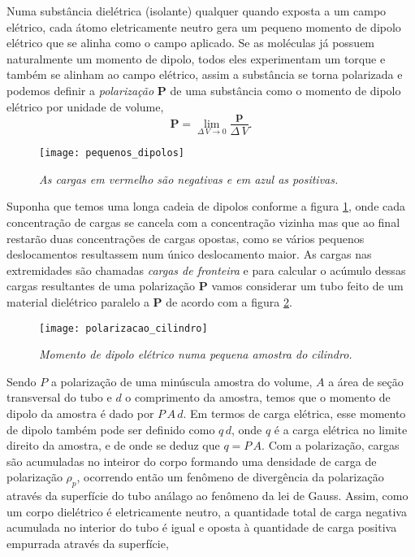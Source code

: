 Numa substância dielétrica (isolante) qualquer quando exposta a um campo elétrico, cada átomo eletricamente neutro gera um pequeno momento de dipolo elétrico que se alinha como o campo aplicado. Se as moléculas já possuem naturalmente um momento de dipolo, todos eles experimentam um torque e também se alinham ao campo elétrico, assim a substância se torna polarizada e podemos definir a \textit{polarização} $\mathbf{P}$ de uma substância como o momento de dipolo elétrico por unidade de volume,
\begin{equation}
\mathbf{P}=\lim_{\Delta\,V\to 0}\frac{\mathbf{p}}{\Delta\,V}.
\end{equation}
\begin{figure}
\centering
\texttt{[image: pequenos\_dipolos]}
\caption{\textit{As cargas em vermelho são negativas e em azul as positivas.}}
\label{fig.penquenos_dipolos}
\end{figure}
Suponha que temos uma longa cadeia de dipolos conforme a figura \ref{fig.penquenos_dipolos}, onde cada concentração de cargas se cancela com a concentração vizinha mas que ao final restarão duas concentrações de cargas opostas, como se vários pequenos deslocamentos resultassem num único deslocamento maior. As cargas nas extremidades são chamadas \textit{cargas de fronteira} e para calcular o acúmulo dessas cargas resultantes de uma polarização $\mathbf{P}$ vamos considerar um tubo feito de um material dielétrico paralelo a $\mathbf{P}$ de acordo com a figura \ref{fig.polari_cilindro}. 
\begin{figure}
\centering
\texttt{[image: polarizacao\_cilindro]}
\caption{\textit{Momento de dipolo elétrico numa pequena amostra do cilindro.}}
\label{fig.polari_cilindro}
\end{figure}
Sendo $P$ a polarização de uma minúscula amostra do volume, $A$ a área de seção transversal do tubo e $d$ o comprimento da amostra, temos que o momento de dipolo da amostra é dado por $P\,A\,d$. Em termos de carga elétrica, esse momento de dipolo também pode ser definido como $q\,d$, onde $q$ é a carga elétrica no limite direito da amostra, e de onde se deduz que $q=P\,A$. Com a polarização, cargas são acumuladas no inteiror do corpo formando uma densidade de carga de polarização $\rho_p$, ocorrendo então um fenômeno de divergência da polarização através da superfície do tubo análago ao fenômeno da lei de Gauss. Assim, como um corpo dielétrico é eletricamente neutro, a quantidade total de carga negativa acumulada no interior do tubo é igual e oposta à quantidade de carga positiva empurrada através da superfície,
